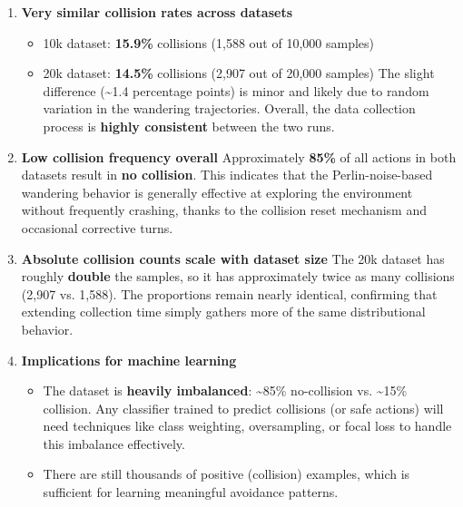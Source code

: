 \begin{enumerate}
\item \textbf{Very similar collision rates across datasets}

\begin{itemize}
\item 10k dataset: \textbf{15.9\%} collisions (1,588 out of 10,000 samples)
\item 20k dataset: \textbf{14.5\%} collisions (2,907 out of 20,000 samples)\newline
The slight difference ({\textasciitilde}1.4 percentage points) is minor and likely due to random variation in the wandering trajectories. Overall, the data collection process is \textbf{highly consistent} between the two runs.
\end{itemize}


\item \textbf{Low collision frequency overall}\newline
Approximately \textbf{85\%} of all actions in both datasets result in \textbf{no collision}. This indicates that the Perlin-noise-based wandering behavior is generally effective at exploring the environment without frequently crashing, thanks to the collision reset mechanism and occasional corrective turns.
\item \textbf{Absolute collision counts scale with dataset size}\newline
The 20k dataset has roughly \textbf{double} the samples, so it has approximately twice as many collisions (2,907 vs. 1,588). The proportions remain nearly identical, confirming that extending collection time simply gathers more of the same distributional behavior.
\item \textbf{Implications for machine learning}

\begin{itemize}
\item The dataset is \textbf{heavily imbalanced}: {\textasciitilde}85\% no-collision vs. {\textasciitilde}15\% collision.\newline
Any classifier trained to predict collisions (or safe actions) will need techniques like class weighting, oversampling, or focal loss to handle this imbalance effectively.
\item There are still thousands of positive (collision) examples, which is sufficient for learning meaningful avoidance patterns.
\end{itemize}
\end{enumerate}

